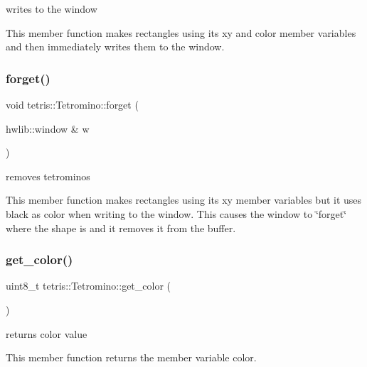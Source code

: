 writes to the window 

This member function makes rectangles using its xy and color member variables and then immediately writes them to the window. \mbox{\label{classtetris_1_1Tetromino_a17a79ae9e1d8c7a4041f2f0192923a2b}} 
\subsubsection{\texorpdfstring{forget()}{forget()}}
{\footnotesize\ttfamily void tetris\+::\+Tetromino\+::forget (\begin{DoxyParamCaption}\item[{hwlib\+::window \&}]{w }\end{DoxyParamCaption})\hspace{0.3cm}{\ttfamily [inline]}}



removes tetromino\textquotesingle{}s 

This member function makes rectangles using its xy member variables but it uses black as color when writing to the window. This causes the window to \char`\"{}forget\char`\"{} where the shape is and it removes it from the buffer. \mbox{\label{classtetris_1_1Tetromino_a379719e9cb92b02c84f7a4ed99d1a391}} 
\subsubsection{\texorpdfstring{get\+\_\+color()}{get\_color()}}
{\footnotesize\ttfamily uint8\+\_\+t tetris\+::\+Tetromino\+::get\+\_\+color (\begin{DoxyParamCaption}{ }\end{DoxyParamCaption})\hspace{0.3cm}{\ttfamily [inline]}}



returns color value 

This member function returns the member variable color. \mbox{\label{classtetris_1_1Tetromino_a581b04b1c750ab0e2ebca62aba4611f7}} 
